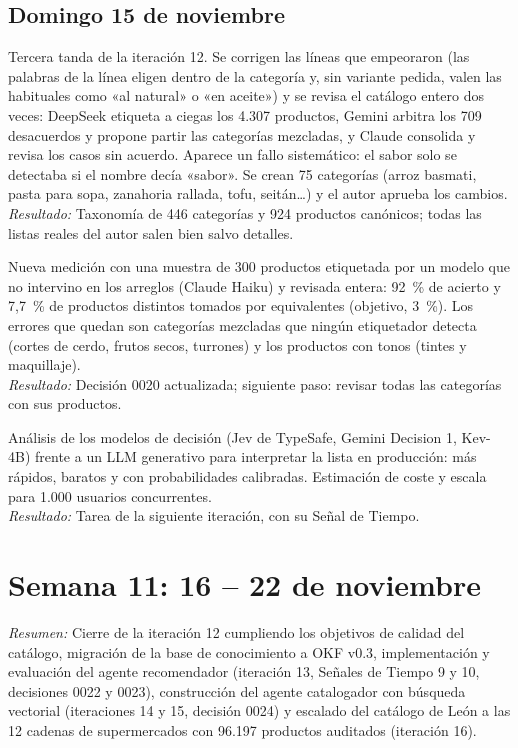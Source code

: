 \documentclass[11pt,a4paper]{article}
\newcommand{\actividad}[3]{\item[\textbf{[#1]}] #2 \\ \textit{Resultado:} #3}
\begin{document}
	\subsection*{Domingo 15 de noviembre}
	\begin{description}[leftmargin=0pt, itemsep=6pt]
		\actividad{Tarea}{Tercera tanda de la iteración 12. Se corrigen las líneas que empeoraron (las palabras de la línea eligen dentro de la categoría y, sin variante pedida, valen las habituales como «al natural» o «en aceite») y se revisa el catálogo entero dos veces: DeepSeek etiqueta a ciegas los 4.307 productos, Gemini arbitra los 709 desacuerdos y propone partir las categorías mezcladas, y Claude consolida y revisa los casos sin acuerdo. Aparece un fallo sistemático: el sabor solo se detectaba si el nombre decía «sabor». Se crean 75 categorías (arroz basmati, pasta para sopa, zanahoria rallada, tofu, seitán…) y el autor aprueba los cambios.}{Taxonomía de 446 categorías y 924 productos canónicos; todas las listas reales del autor salen bien salvo detalles.}
		\actividad{Análisis}{Nueva medición con una muestra de 300 productos etiquetada por un modelo que no intervino en los arreglos (Claude Haiku) y revisada entera: 92~\% de acierto y 7,7~\% de productos distintos tomados por equivalentes (objetivo, 3~\%). Los errores que quedan son categorías mezcladas que ningún etiquetador detecta (cortes de cerdo, frutos secos, turrones) y los productos con tonos (tintes y maquillaje).}{Decisión 0020 actualizada; siguiente paso: revisar todas las categorías con sus productos.}
		\actividad{Investigación}{Análisis de los modelos de decisión (Jev de TypeSafe, Gemini Decision 1, Kev-4B) frente a un LLM generativo para interpretar la lista en producción: más rápidos, baratos y con probabilidades calibradas. Estimación de coste y escala para 1.000 usuarios concurrentes.}{Tarea de la siguiente iteración, con su Señal de Tiempo.}
	\end{description}

	\section*{Semana 11: 16 -- 22 de noviembre}
	\textit{Resumen:} Cierre de la iteración 12 cumpliendo los objetivos de calidad del catálogo, migración de la base de conocimiento a OKF v0.3, implementación y evaluación del agente recomendador (iteración 13, Señales de Tiempo 9 y 10, decisiones 0022 y 0023), construcción del agente catalogador con búsqueda vectorial (iteraciones 14 y 15, decisión 0024) y escalado del catálogo de León a las 12 cadenas de supermercados con 96.197 productos auditados (iteración 16).
\end{document}
